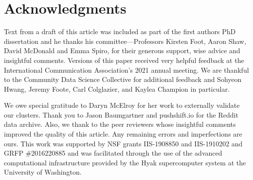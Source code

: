 \documentclass[letterpaper]{article}\usepackage[]{graphicx}\usepackage[]{color}
\begin{document}
\section*{Acknowledgments}
Text from a draft of this article was included as part of the first authors PhD dissertation and he thanks his committee---Professors Kirsten Foot, Aaron Shaw, David McDonald and Emma Spiro,  for their generous support, wise advice and insightful comments. 
Versions of this paper received very helpful feedback at the  International Communication Association's 2021 annual meeting. We are thankful to the Community Data Science Collective for additional feedback and Sohyeon Hwang, Jeremy Foote,  Carl Colglazier, and Kaylea Champion in particular.

We owe special gratitude to Daryn McElroy for her work to externally validate our clusters.
Thank you to Jason Baumgartner and pushshift.io for the Reddit data archive.
Also, we thank to the peer reviewers whose insightful comments improved the quality of this article. Any remaining errors and imperfections are ours.  
This work was supported by NSF grants IIS-1908850 and IIS-1910202 and GRFP \#2016220885 and was facilitated through the use of the advanced computational infrastructure provided by the Hyak supercomputer system at the University of Washington.



\end{document}
